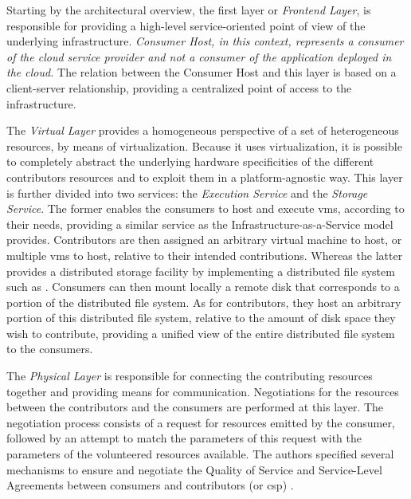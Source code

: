 \documentclass[12pt, titlepage]{uo_temp}
\begin{document}
     Starting by the architectural overview, the first layer or \emph{Frontend Layer}, is
     responsible for providing a high-level service-oriented point of view of the
     underlying infrastructure. \emph{Consumer Host, in this context, represents a consumer
       of the cloud service provider and not a consumer of the application deployed in the
       cloud.} The relation between the Consumer Host and this layer is based on a
     client-server relationship, providing a centralized point of access to the
     infrastructure.

     The \emph{Virtual Layer} provides a homogeneous perspective of a set of heterogeneous
     resources, by means of virtualization. Because it uses virtualization, it is possible to
     completely abstract the underlying hardware specificities of the different
     contributors resources and to exploit them in a platform-agnostic way. This layer is
     further divided into two services: the \emph{Execution Service} and the \emph{Storage
       Service}. The former enables the consumers to host and execute \gls{vm}s, according
     to their needs, providing a similar service as the Infrastructure-as-a-Service model
     provides. Contributors are then assigned an arbitrary virtual machine to host, or multiple
     \gls{vm}s to host, relative to their intended contributions. Whereas the latter
     provides a distributed storage facility by implementing a distributed file system
     such as \cite{gfs}. Consumers can then mount locally a remote disk that corresponds to a
     portion of the distributed file system. As for contributors, they host an arbitrary
     portion of this distributed file system, relative to the amount of disk space they wish to
     contribute, providing a unified view of the entire distributed file system to the
     consumers.

     The \emph{Physical Layer} is responsible for connecting the contributing resources
     together and providing means for communication. Negotiations for the resources
     between the contributors and the consumers are performed at this layer. The
     negotiation process consists of a request for resources emitted by the consumer,
     followed by an attempt to match the parameters of this request with the parameters of
     the volunteered resources available. The authors specified several mechanisms to ensure and
     negotiate the Quality of Service and Service-Level Agreements between consumers and
     contributors (or \gls{csp}) \cite{aversa2011cloudperf}\cite{aversa2011cloud}.
\end{document}
